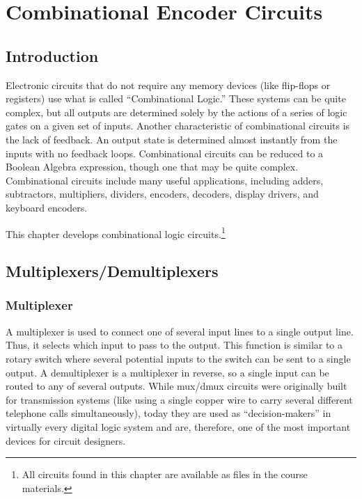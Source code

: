 \chapter{Combinational Encoder Circuits}\label{ch09}
\section{Introduction}

Electronic circuits that do not require any memory devices (like flip-flops or registers) use what is called ``Combinational Logic.'' These systems can be quite complex, but all outputs are determined solely by the actions of a series of logic gates on a given set of inputs. Another characteristic of combinational circuits is the lack of feedback. An output state is determined almost instantly from the inputs with no feedback loops. Combinational circuits can be reduced to a Boolean Algebra expression, though one that may be quite complex. Combinational circuits include many useful applications, including adders, subtractors, multipliers, dividers, encoders, decoders, display drivers, and keyboard encoders.
 
This chapter develops combinational logic circuits.\footnote{All circuits found in this chapter are available as \Le files in the course materials.}

\section{Multiplexers/Demultiplexers}
\label{CL:sec:multiplexers_demultiplexers}

\subsection{Multiplexer}
\label{CL:subsec:multiplexer}


A multiplexer is used to connect one of several input lines to a single output line. Thus, it selects which input to pass to the output. This function is similar to a rotary switch where several potential inputs to the switch can be sent to a single output. A demultiplexer is a multiplexer in reverse, so a single input can be routed to any of several outputs. While mux/dmux circuits were originally built for transmission systems (like using a single copper wire to carry several different telephone calls simultaneously), today they are used as ``decision-makers'' in virtually every digital logic system and are, therefore, one of the most important devices for circuit designers. 

